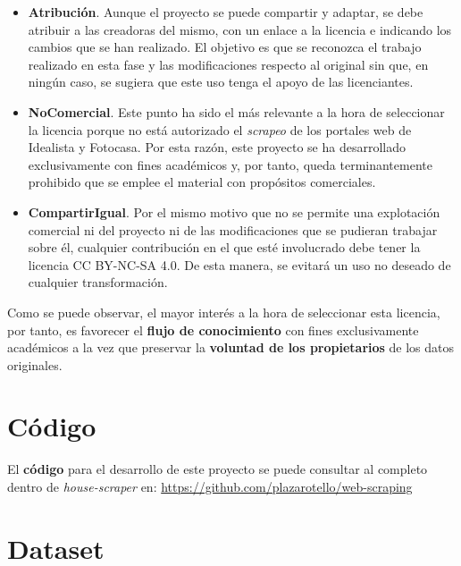 \documentclass[12pt]{article}
\begin{document}
\begin{itemize}
	\item \textbf{Atribución}. Aunque el proyecto se puede compartir y adaptar, se debe atribuir a las creadoras del mismo, con un enlace a la licencia e indicando los cambios que se han realizado. El objetivo es que se reconozca el trabajo realizado en esta fase y las modificaciones respecto al original sin que, en ningún caso, se sugiera que este uso tenga el apoyo de las licenciantes.  
	
	\item \textbf{NoComercial}. Este punto ha sido el más relevante a la hora de seleccionar la licencia porque no está autorizado el \textit{scrapeo} de los portales web de Idealista y Fotocasa. Por esta razón, este proyecto se ha desarrollado exclusivamente con fines académicos y, por tanto, queda terminantemente prohibido que se emplee el material con propósitos comerciales. 
	
	\item \textbf{CompartirIgual}. Por el mismo motivo que no se permite una explotación comercial ni del proyecto ni de las modificaciones que se pudieran trabajar sobre él, cualquier contribución en el que esté involucrado debe tener la licencia CC BY-NC-SA 4.0. De esta manera, se evitará un uso no deseado de cualquier transformación.
\end{itemize}

Como se puede observar, el mayor interés a la hora de seleccionar esta licencia, por tanto, es favorecer el \textbf{flujo de conocimiento} con fines exclusivamente académicos a la vez que preservar la\textbf{ voluntad de los propietarios} de los datos originales. 

\vspace{-1.5em}\section{Código }\vspace{-1.5em}

El \textbf{código} para el desarrollo de este proyecto se puede consultar al completo dentro de \textit{house-scraper} en: \url{https://github.com/plazarotello/web-scraping}

\vspace{-1.5em}\section{Dataset }\vspace{-1.5em}
\end{document}
